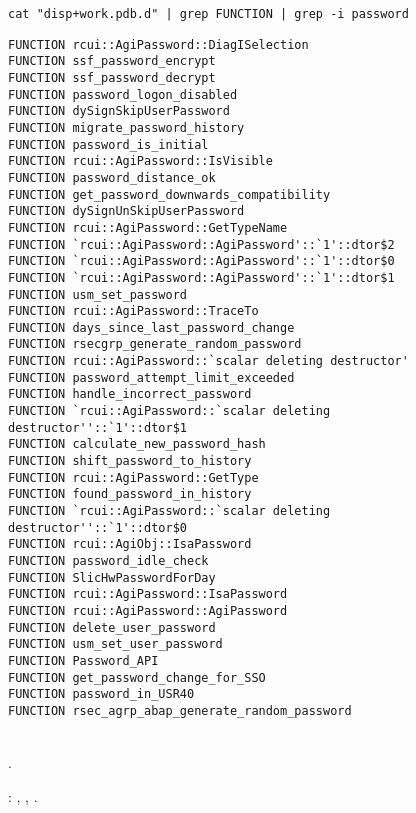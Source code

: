 \begin{lstlisting}
cat "disp+work.pdb.d" | grep FUNCTION | grep -i password
\end{lstlisting}


\begin{lstlisting}
FUNCTION rcui::AgiPassword::DiagISelection 
FUNCTION ssf_password_encrypt 
FUNCTION ssf_password_decrypt 
FUNCTION password_logon_disabled 
FUNCTION dySignSkipUserPassword 
FUNCTION migrate_password_history 
FUNCTION password_is_initial 
FUNCTION rcui::AgiPassword::IsVisible 
FUNCTION password_distance_ok 
FUNCTION get_password_downwards_compatibility 
FUNCTION dySignUnSkipUserPassword 
FUNCTION rcui::AgiPassword::GetTypeName 
FUNCTION `rcui::AgiPassword::AgiPassword'::`1'::dtor$2 
FUNCTION `rcui::AgiPassword::AgiPassword'::`1'::dtor$0 
FUNCTION `rcui::AgiPassword::AgiPassword'::`1'::dtor$1 
FUNCTION usm_set_password 
FUNCTION rcui::AgiPassword::TraceTo 
FUNCTION days_since_last_password_change 
FUNCTION rsecgrp_generate_random_password 
FUNCTION rcui::AgiPassword::`scalar deleting destructor' 
FUNCTION password_attempt_limit_exceeded 
FUNCTION handle_incorrect_password 
FUNCTION `rcui::AgiPassword::`scalar deleting destructor''::`1'::dtor$1 
FUNCTION calculate_new_password_hash 
FUNCTION shift_password_to_history 
FUNCTION rcui::AgiPassword::GetType 
FUNCTION found_password_in_history 
FUNCTION `rcui::AgiPassword::`scalar deleting destructor''::`1'::dtor$0 
FUNCTION rcui::AgiObj::IsaPassword 
FUNCTION password_idle_check 
FUNCTION SlicHwPasswordForDay 
FUNCTION rcui::AgiPassword::IsaPassword 
FUNCTION rcui::AgiPassword::AgiPassword 
FUNCTION delete_user_password 
FUNCTION usm_set_user_password 
FUNCTION Password_API 
FUNCTION get_password_change_for_SSO 
FUNCTION password_in_USR40 
FUNCTION rsec_agrp_abap_generate_random_password 
\end{lstlisting}

   \\
 .

: 
, , .

